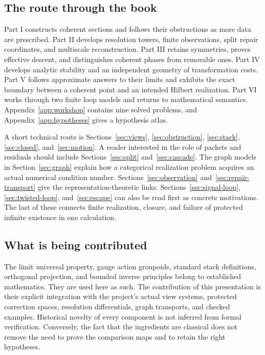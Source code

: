 \documentclass[11pt]{article}
\begin{document}
\subsection*{The route through the book}
Part I constructs coherent sections and follows their obstructions as more data are prescribed. Part II develops resolution towers, finite observations, split repair coordinates, and multiscale reconstruction. Part III retains symmetries, proves effective descent, and distinguishes coherent phases from removable ones. Part IV develops analytic stability and an independent geometry of transformation costs. Part V follows approximate answers to their limits and exhibits the exact boundary between a coherent point and an intended Hilbert realization. Part VI works through two finite loop models and returns to mathematical semantics. Appendix~\ref{app:workshop} contains nine solved problems, and Appendix~\ref{app:hypotheses} gives a hypothesis atlas.

A short technical route is Sections~\ref{sec:views}, \ref{sec:obstruction}, \ref{sec:stack}, \ref{sec:closed}, and~\ref{sec:motion}. A reader interested in the role of packets and residuals should include Sections~\ref{sec:split} and~\ref{sec:cascade}. The graph models in Section~\ref{sec:graph} explain how a categorical realization problem acquires an actual numerical condition number. Sections~\ref{sec:observation} and~\ref{sec:repair-transport} give the representation-theoretic links. Sections~\ref{sec:signal-loop}, \ref{sec:twisted-loop}, and~\ref{sec:escape} can also be read first as concrete motivations. The last of these connects finite realization, closure, and failure of protected infinite existence in one calculation.

\subsection*{What is being contributed}
The limit universal property, gauge action groupoids, standard stack definitions, orthogonal projection, and bounded inverse principles belong to established mathematics. They are used here as such. The contribution of this presentation is their explicit integration with the project's actual view systems, protected correction spaces, resolution differentials, graph transports, and checked examples. Historical novelty of every component is not inferred from formal verification. Conversely, the fact that the ingredients are classical does not remove the need to prove the comparison maps and to retain the right hypotheses.

\clearpage\begingroup\setlength{\parskip}{0pt}\tableofcontents\endgroup
\clearpage{}















\appendix




\end{document}
